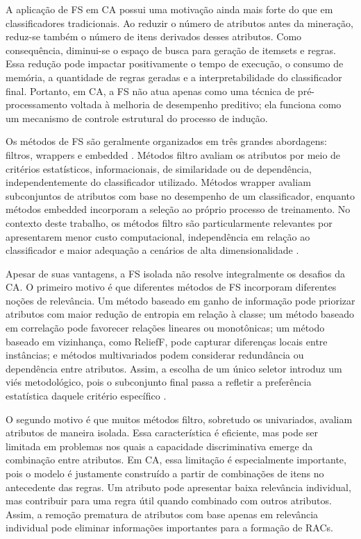 A aplicação de FS em CA possui uma motivação ainda mais forte do que em classificadores tradicionais. Ao reduzir o número de atributos antes da mineração, reduz-se também o número de itens derivados desses atributos. Como consequência, diminui-se o espaço de busca para geração de itemsets e regras. Essa redução pode impactar positivamente o tempo de execução, o consumo de memória, a quantidade de regras geradas e a interpretabilidade do classificador final. Portanto, em CA, a FS não atua apenas como uma técnica de pré-processamento voltada à melhoria de desempenho preditivo; ela funciona como um mecanismo de controle estrutural do processo de indução.

Os métodos de FS são geralmente organizados em três grandes abordagens: filtros, wrappers e embedded \cite{Dhal2022,Theng2024}. Métodos filtro avaliam os atributos por meio de critérios estatísticos, informacionais, de similaridade ou de dependência, independentemente do classificador utilizado. Métodos wrapper avaliam subconjuntos de atributos com base no desempenho de um classificador, enquanto métodos embedded incorporam a seleção ao próprio processo de treinamento. No contexto deste trabalho, os métodos filtro são particularmente relevantes por apresentarem menor custo computacional, independência em relação ao classificador e maior adequação a cenários de alta dimensionalidade \cite{SolorioFernandez2020,Bouchlaghem2022,Theng2024}.

Apesar de suas vantagens, a FS isolada não resolve integralmente os desafios da CA. O primeiro motivo é que diferentes métodos de FS incorporam diferentes noções de relevância. Um método baseado em ganho de informação pode priorizar atributos com maior redução de entropia em relação à classe; um método baseado em correlação pode favorecer relações lineares ou monotônicas; um método baseado em vizinhança, como ReliefF, pode capturar diferenças locais entre instâncias; e métodos multivariados podem considerar redundância ou dependência entre atributos. Assim, a escolha de um único seletor introduz um viés metodológico, pois o subconjunto final passa a refletir a preferência estatística daquele critério específico \cite{KHAIRE20221060,BARBIERI2024123667}.

O segundo motivo é que muitos métodos filtro, sobretudo os univariados, avaliam atributos de maneira isolada. Essa característica é eficiente, mas pode ser limitada em problemas nos quais a capacidade discriminativa emerge da combinação entre atributos. Em CA, essa limitação é especialmente importante, pois o modelo é justamente construído a partir de combinações de itens no antecedente das regras. Um atributo pode apresentar baixa relevância individual, mas contribuir para uma regra útil quando combinado com outros atributos. Assim, a remoção prematura de atributos com base apenas em relevância individual pode eliminar informações importantes para a formação de RACs.

